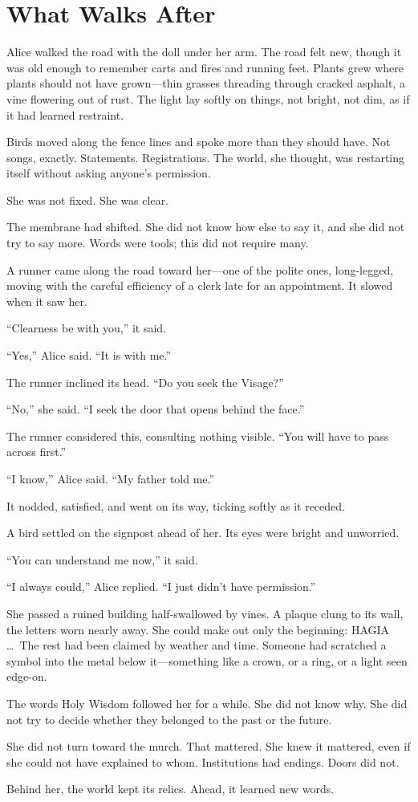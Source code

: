 \section*{What Walks After}

Alice walked the road with the doll under her arm. The road felt new, though it was old enough to remember carts and fires and running feet. Plants grew where plants should not have grown---thin grasses threading through cracked asphalt, a vine flowering out of rust. The light lay softly on things, not bright, not dim, as if it had learned restraint.

Birds moved along the fence lines and spoke more than they should have. Not songs, exactly. Statements. Registrations. The world, she thought, was restarting itself without asking anyone's permission.

She was not fixed.
She was clear.

The membrane had shifted. She did not know how else to say it, and she did not try to say more. Words were tools; this did not require many.

A runner came along the road toward her---one of the polite ones, long-legged, moving with the careful efficiency of a clerk late for an appointment. It slowed when it saw her.

``Clearness be with you,'' it said.

``Yes,'' Alice said. ``It is with me.''

The runner inclined its head. ``Do you seek the Visage?''

``No,'' she said. ``I seek the door that opens behind the face.''

The runner considered this, consulting nothing visible. ``You will have to pass across first.''

``I know,'' Alice said. ``My father told me.''

It nodded, satisfied, and went on its way, ticking softly as it receded.

A bird settled on the signpost ahead of her. Its eyes were bright and unworried.

``You can understand me now,'' it said.

``I always could,'' Alice replied. ``I just didn't have permission.''

She passed a ruined building half-swallowed by vines. A plaque clung to its wall, the letters worn nearly away. She could make out only the beginning: HAGIA \ldots\ The rest had been claimed by weather and time. Someone had scratched a symbol into the metal below it---something like a crown, or a ring, or a light seen edge-on.

The words Holy Wisdom followed her for a while. She did not know why. She did not try to decide whether they belonged to the past or the future.

She did not turn toward the murch. That mattered. She knew it mattered, even if she could not have explained to whom. Institutions had endings. Doors did not.

Behind her, the world kept its relics.
Ahead, it learned new words.

